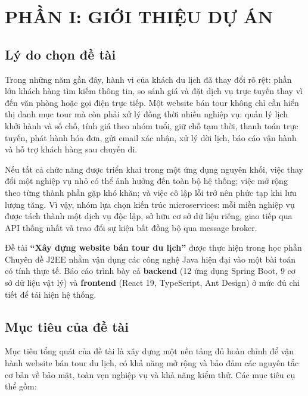 \chapter{PHẦN I: GIỚI THIỆU DỰ ÁN}
\label{chap:gioi-thieu}

\section{Lý do chọn đề tài}
\label{sec:ly-do}

Trong những năm gần đây, hành vi của khách du lịch đã thay đổi rõ rệt: phần lớn khách hàng tìm kiếm thông tin, so sánh giá và đặt dịch vụ trực tuyến thay vì đến văn phòng hoặc gọi điện trực tiếp. Một website bán tour không chỉ cần hiển thị danh mục tour mà còn phải xử lý đồng thời nhiều nghiệp vụ: quản lý lịch khởi hành và số chỗ, tính giá theo nhóm tuổi, giữ chỗ tạm thời, thanh toán trực tuyến, phát hành hóa đơn, gửi email xác nhận, xử lý dời lịch, báo cáo vận hành và hỗ trợ khách hàng sau chuyến đi.

Nếu tất cả chức năng được triển khai trong một ứng dụng nguyên khối, việc thay đổi một nghiệp vụ nhỏ có thể ảnh hưởng đến toàn bộ hệ thống; việc mở rộng theo từng thành phần gặp khó khăn; và việc cô lập lỗi trở nên phức tạp khi lưu lượng tăng. Vì vậy, nhóm lựa chọn kiến trúc microservices: mỗi miền nghiệp vụ được tách thành một dịch vụ độc lập, sở hữu cơ sở dữ liệu riêng, giao tiếp qua API thống nhất và trao đổi sự kiện bất đồng bộ qua message broker.

Đề tài \textbf{“Xây dựng website bán tour du lịch”} được thực hiện trong học phần Chuyên đề J2EE nhằm vận dụng các công nghệ Java hiện đại vào một bài toán có tính thực tế. Báo cáo trình bày cả \textbf{backend} (12 ứng dụng Spring Boot, 9 cơ sở dữ liệu vật lý) và \textbf{frontend} (React 19, TypeScript, Ant Design) ở mức đủ chi tiết để tái hiện hệ thống.

\section{Mục tiêu của đề tài}
\label{sec:muc-tieu}

Mục tiêu tổng quát của đề tài là xây dựng một nền tảng đủ hoàn chỉnh để vận hành website bán tour du lịch, có khả năng mở rộng và bảo đảm các nguyên tắc cơ bản về bảo mật, toàn vẹn nghiệp vụ và khả năng kiểm thử. Các mục tiêu cụ thể gồm:


